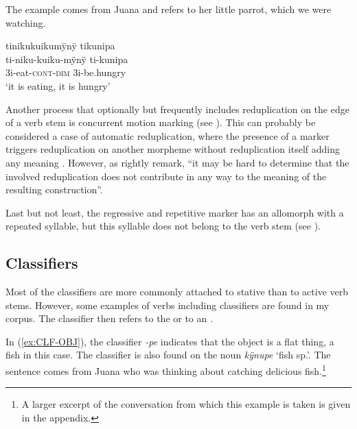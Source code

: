 
The example comes from Juana and refers to her little parrot, which we were watching.

\ea\label{ex:Cont-infl-2}
\begingl
\glpreamble tinikukuikumÿnÿ tikunipa\\
\gla ti-niku-kuiku-mÿnÿ ti-kunipa\\
\glb 3i-eat-\textsc{cont}-\textsc{dim} 3i-be.hungry\\
\glft ‘it is eating, it is hungry’
\endgl
\trailingcitation{[jxx-e110923l-2.007]}
\xe
{}


Another process that optionally but frequently includes reduplication on the edge of a verb stem is concurrent motion marking (see ). This can probably be considered a case of automatic reduplication, where the presence of a marker triggers reduplication on another morpheme without reduplication itself adding any meaning \citep[cf.][18]{Rubino2005}. However, as \citet[3, Footnote 1]{GomezVoort2014} rightly remark, “it may be hard to determine that the involved reduplication does not contribute in any way to the meaning of the resulting construction”.

Last but not least, the regressive and repetitive marker has an allomorph with a repeated syllable, but this syllable does not belong to the verb stem (see ). 


\subsection{Classifiers}\label{sec:CLF_ActiveVerbs}

Most of the classifiers are more commonly attached to stative than to active verb stems. However, some examples of  verbs including classifiers are found in my corpus. The classifier then refers to the  or to an . 

In (\ref{ex:CLF-OBJ}), the classifier \textit{-pe} indicates that the object is a flat thing, a fish in this case. The classifier is also found on the noun \textit{kÿnupe} ‘fish sp.’. The sentence comes from Juana who was thinking about catching delicious fish.\footnote{A larger excerpt of the conversation from which this example is taken is given in the appendix.}

